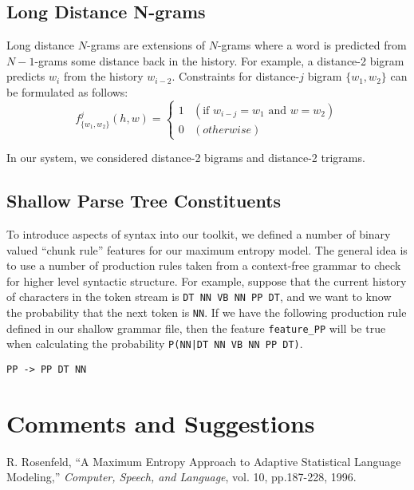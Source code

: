 \documentclass[11pt]{article}
\begin{document}
\subsection{Long Distance N-grams}

Long distance $N$-grams are extensions of $N$-grams where a word is predicted from $N-1$-grams some distance back in the history.
For example, a distance-2 bigram predicts $w_i$ from the history $w_{i-2}$.
Constraints for distance-$j$ bigram $\{w_1, w_2\}$ can be formulated as follows:
\[
  f_{\{w_1, w_2\}}^{j}(h, w) = \begin{cases}
    1 & (\textrm{if } w_{i-j} = w_1 \textrm{ and } w = w_2) \\
    0 & (otherwise)
  \end{cases}
\]

\noindent
In our system, we considered distance-2 bigrams and distance-2 trigrams.

\subsection{Shallow Parse Tree Constituents}

To introduce aspects of syntax into our toolkit, we defined a number of
binary valued ``chunk rule'' features for our maximum entropy model. The
general idea is to use a number of production rules taken from a
context-free grammar to check for higher level syntactic structure. For
example, suppose that the current history of characters in the token
stream is \texttt{DT NN VB NN PP DT}, and we want to know the
probability that the next token is \texttt{NN}. If we have the following
production rule defined in our shallow grammar file, then the feature
\texttt{feature\_PP} will be true when calculating the probability
\texttt{P(NN|DT NN VB NN PP DT)}.

\begin{verbatim}
PP -> PP DT NN
\end{verbatim}

\section{Comments and Suggestions}


\begin{thebibliography}{}

R. Rosenfeld,
``A Maximum Entropy Approach to Adaptive Statistical Language Modeling,''
{\em Computer, Speech, and Language}, vol. 10, pp.187-228, 1996.

\end{thebibliography}
\end{document}
